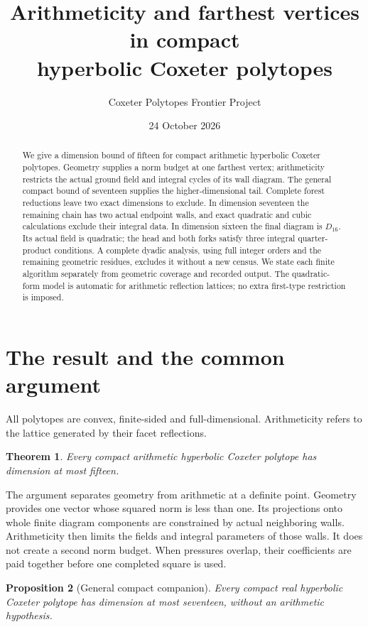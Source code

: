 \documentclass[11pt]{article}
\title{Arithmeticity and farthest vertices in compact\\
hyperbolic Coxeter polytopes}
\author{Coxeter Polytopes Frontier Project}
\date{24 October 2026}
\newtheorem{theorem}{Theorem}
\newtheorem{proposition}[theorem]{Proposition}
\begin{document}
\maketitle
\begin{abstract}
We give a dimension bound of fifteen for compact arithmetic hyperbolic
Coxeter polytopes. Geometry supplies a norm budget at one farthest
vertex; arithmeticity restricts the actual ground field and integral
cycles of its wall diagram. The general compact bound of seventeen
supplies the higher-dimensional tail. Complete forest reductions leave
two exact dimensions to exclude. In dimension seventeen the remaining
chain has two actual endpoint walls, and exact quadratic and cubic
calculations exclude their integral data. In dimension sixteen the
final diagram is $D_{16}$. Its actual field is quadratic; the head and
both forks satisfy three integral quarter-product conditions.
A complete dyadic analysis, using full integer orders and the remaining
geometric residues, excludes it without a new census. We state each
finite algorithm separately from geometric coverage and recorded output.
The quadratic-form model is automatic for arithmetic reflection
lattices; no extra first-type restriction is imposed.
\end{abstract}

\section{The result and the common argument}\label{sec:scope}

All polytopes are convex, finite-sided and full-dimensional.
Arithmeticity refers to the lattice generated by their facet reflections.

\begin{theorem}\label{thm:main}
Every compact arithmetic hyperbolic Coxeter polytope has dimension at
most fifteen.
\end{theorem}

The argument separates geometry from arithmetic at a definite point.
Geometry provides one vector whose squared norm is less than one.
Its projections onto whole finite diagram components are constrained
by actual neighboring walls. Arithmeticity then limits the fields and
integral parameters of those walls. It does not create a second norm
budget. When pressures overlap, their coefficients are paid together
before one completed square is used.

\begin{proposition}[General compact companion]\label{prop:general17}
Every compact real hyperbolic Coxeter polytope has dimension at most
seventeen, without an arithmetic hypothesis.
\end{proposition}
\end{document}
